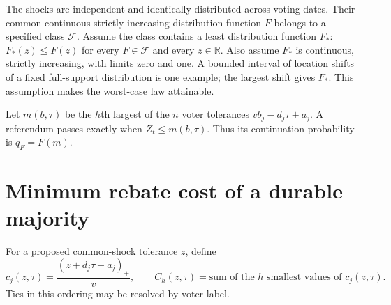 \documentclass[11pt,a4paper]{article}
\theoremstyle{definition}
\theoremstyle{remark}
\newcommand{\R}{\mathbb R}
\begin{document}
The shocks are independent and identically distributed across voting dates. Their common continuous strictly increasing distribution function $F$ belongs to a specified class $\mathcal F$. Assume the class contains a least distribution function $F_*$: $F_*(z)\leq F(z)$ for every $F\in\mathcal F$ and every $z\in\R$. Also assume $F_*$ is continuous, strictly increasing, with limits zero and one. A bounded interval of location shifts of a fixed full-support distribution is one example; the largest shift gives $F_*$. This assumption makes the worst-case law attainable.

Let $m(b,\tau)$ be the $h$th largest of the $n$ voter tolerances $v b_j-d_j\tau+a_j$. A referendum passes exactly when $Z_t\leq m(b,\tau)$. Thus its continuation probability is $q_F=F(m)$.

\section{Minimum rebate cost of a durable majority}
For a proposed common-shock tolerance $z$, define
\[
 c_j(z,\tau)=\frac{(z+d_j\tau-a_j)_+}{v},\qquad
 C_h(z,\tau)=\text{sum of the }h\text{ smallest values of }c_j(z,\tau).
\]
Ties in this ordering may be resolved by voter label.
\end{document}
